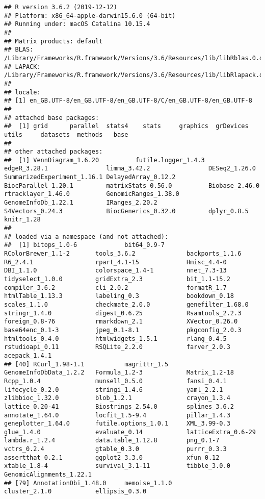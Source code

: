 \documentclass[]{book}
\begin{document}
\begin{verbatim}
## R version 3.6.2 (2019-12-12)
## Platform: x86_64-apple-darwin15.6.0 (64-bit)
## Running under: macOS Catalina 10.15.4
## 
## Matrix products: default
## BLAS:   /Library/Frameworks/R.framework/Versions/3.6/Resources/lib/libRblas.0.dylib
## LAPACK: /Library/Frameworks/R.framework/Versions/3.6/Resources/lib/libRlapack.dylib
## 
## locale:
## [1] en_GB.UTF-8/en_GB.UTF-8/en_GB.UTF-8/C/en_GB.UTF-8/en_GB.UTF-8
## 
## attached base packages:
##  [1] grid      parallel  stats4    stats     graphics  grDevices utils     datasets  methods   base     
## 
## other attached packages:
##  [1] VennDiagram_1.6.20          futile.logger_1.4.3         edgeR_3.28.1                limma_3.42.2                DESeq2_1.26.0               SummarizedExperiment_1.16.1 DelayedArray_0.12.2         BiocParallel_1.20.1         matrixStats_0.56.0          Biobase_2.46.0              rtracklayer_1.46.0          GenomicRanges_1.38.0        GenomeInfoDb_1.22.1         IRanges_2.20.2              S4Vectors_0.24.3            BiocGenerics_0.32.0         dplyr_0.8.5                 knitr_1.28                 
## 
## loaded via a namespace (and not attached):
##  [1] bitops_1.0-6             bit64_0.9-7              RColorBrewer_1.1-2       tools_3.6.2              backports_1.1.6          R6_2.4.1                 rpart_4.1-15             Hmisc_4.4-0              DBI_1.1.0                colorspace_1.4-1         nnet_7.3-13              tidyselect_1.0.0         gridExtra_2.3            bit_1.1-15.2             compiler_3.6.2           cli_2.0.2                formatR_1.7              htmlTable_1.13.3         labeling_0.3             bookdown_0.18            scales_1.1.0             checkmate_2.0.0          genefilter_1.68.0        stringr_1.4.0            digest_0.6.25            Rsamtools_2.2.3          foreign_0.8-76           rmarkdown_2.1            XVector_0.26.0           base64enc_0.1-3          jpeg_0.1-8.1             pkgconfig_2.0.3          htmltools_0.4.0          htmlwidgets_1.5.1        rlang_0.4.5              rstudioapi_0.11          RSQLite_2.2.0            farver_2.0.3             acepack_1.4.1           
## [40] RCurl_1.98-1.1           magrittr_1.5             GenomeInfoDbData_1.2.2   Formula_1.2-3            Matrix_1.2-18            Rcpp_1.0.4               munsell_0.5.0            fansi_0.4.1              lifecycle_0.2.0          stringi_1.4.6            yaml_2.2.1               zlibbioc_1.32.0          blob_1.2.1               crayon_1.3.4             lattice_0.20-41          Biostrings_2.54.0        splines_3.6.2            annotate_1.64.0          locfit_1.5-9.4           pillar_1.4.3             geneplotter_1.64.0       futile.options_1.0.1     XML_3.99-0.3             glue_1.4.0               evaluate_0.14            latticeExtra_0.6-29      lambda.r_1.2.4           data.table_1.12.8        png_0.1-7                vctrs_0.2.4              gtable_0.3.0             purrr_0.3.3              assertthat_0.2.1         ggplot2_3.3.0            xfun_0.12                xtable_1.8-4             survival_3.1-11          tibble_3.0.0             GenomicAlignments_1.22.1
## [79] AnnotationDbi_1.48.0     memoise_1.1.0            cluster_2.1.0            ellipsis_0.3.0
\end{verbatim}
\end{document}
